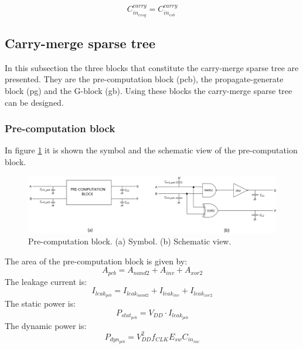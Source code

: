 \begin{equation}
C_{in_{cssg}}^{carry} = C_{in_{csb}}^{carry}
\end{equation}





\subsection{Carry-merge sparse tree}
In this subsection the three blocks that constitute the carry-merge sparse tree are presented. They are the pre-computation block (pcb), the propagate-generate block (pg) and the G-block (gb). Using these blocks the carry-merge sparse tree can be designed.





\subsubsection{Pre-computation block}
In figure \ref{pcb} it is shown the symbol and the schematic view of the pre-computation block.

\begin{figure}[H]
\centering
\includegraphics[width = 14cm]{pentium/pcb.png}
\caption{Pre-computation block. (a) Symbol. (b) Schematic view. }
\label{pcb}
\end{figure}

The  area of the pre-computation block is given by:
\begin{equation}
A_{pcb}=A_{nand2}+A_{inv}+A_{xor2}
\end{equation}
The leakage current is:
\begin{equation}
I_{leak_{pcb}}=I_{leak_{nand2}}+I_{leak_{inv}}+I_{leak_{xor2}}
\end{equation}
The static power is:
\begin{equation}
P_{stat_{pcb}}=V_{DD}\cdot I_{leak_{pcb}}
\end{equation}
The dynamic power is:
\begin{equation}
P_{dyn_{pcb}}=V_{DD}^2f_{CLK}E_{sw}C_{in_{inv}}
\end{equation}

